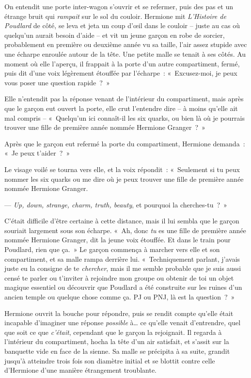 On entendit une porte inter-wagon s'ouvrir et se refermer, puis des pas et un étrange bruit qui \emph{rampait} sur le sol du couloir.
Hermione mit \emph{L'Histoire de Poudlard} de côté, se leva et jeta un coup d'œil dans le couloir -- juste au cas où quelqu'un aurait besoin d'aide -- et vit un jeune garçon en robe de sorcier, probablement en première ou deuxième année vu sa taille, l'air assez stupide avec une écharpe enroulée autour de la tête.
Une petite malle se tenait à ses côtés.
Au moment où elle l'aperçu, il frappait à la porte d'un autre compartiment, fermé, puis dit d'une voix légèrement étouffée par l'écharpe~: «~Excusez-moi, je peux vous poser une question rapide~?~»

Elle n'entendit pas la réponse venant de l'intérieur du compartiment, mais après que le garçon eut ouvert la porte, elle crut l'entendre dire -- à moins qu'elle ait mal compris -- «~Quelqu'un ici connaît-il les six quarks, ou bien là où je pourrais trouver une fille de première année nommée Hermione Granger~?~»

Après que le garçon eut refermé la porte du compartiment, Hermione demanda~: «~Je peux t'aider~?~»

Le visage voilé se tourna vers elle, et la voix répondit~:
«~Seulement si tu peux nommer les six quarks ou me dire où je peux trouver une fille de première année nommée Hermione Granger.

---  \emph{Up, down, strange, charm, truth, beauty}, et pourquoi la cherches-tu~?~»

C'était difficile d'être certaine à cette distance, mais il lui sembla que le garçon souriait largement sous son écharpe.
«~Ah, donc \emph{tu} es une fille de première année nommée Hermione Granger, dit la jeune voix étouffée.
Et dans le train pour Poudlard, rien que ça.~»
Le garçon commença à marcher vers elle et son compartiment, et sa malle rampa derrière lui.
«~Techniquement parlant, j'avais juste eu la consigne de te \emph{chercher}, mais il me semble probable que je suis aussi censé te parler ou t'inviter à rejoindre mon groupe ou obtenir de toi un objet magique essentiel ou découvrir que Poudlard a été construite sur les ruines d'un ancien temple ou quelque chose comme ça.
PJ ou PNJ, là est la question~?~»

Hermione ouvrit la bouche pour répondre, puis se rendit compte qu'elle était incapable d'imaginer une réponse \emph{possible} à…
ce qu'elle venait d'entrendre, quel que soit ce que \emph{c'était}, cependant que le garçon la rejoignait.
Il regarda à l'intérieur du compartiment, hocha la tête d'un air satisfait, et s'assit sur la banquette vide en face de la sienne.
Sa malle se précipita à sa suite, grandit jusqu'à atteindre trois fois son diamètre initial et se blottit contre celle d'Hermione d'une manière étrangement troublante.

